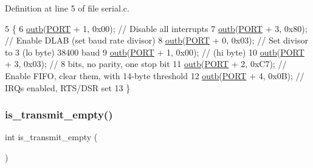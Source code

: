 Definition at line 5 of file serial.\+c.


\begin{DoxyCode}
5                    \{
6    \hyperlink{a00158_aa37f5841c54156a4b14fc0d6f626b44f_aa37f5841c54156a4b14fc0d6f626b44f}{outb}(\hyperlink{a00050_a614217d263be1fb1a5f76e2ff7be19a2_a614217d263be1fb1a5f76e2ff7be19a2}{PORT} + 1, 0x00);    \textcolor{comment}{// Disable all interrupts}
7    \hyperlink{a00158_aa37f5841c54156a4b14fc0d6f626b44f_aa37f5841c54156a4b14fc0d6f626b44f}{outb}(\hyperlink{a00050_a614217d263be1fb1a5f76e2ff7be19a2_a614217d263be1fb1a5f76e2ff7be19a2}{PORT} + 3, 0x80);    \textcolor{comment}{// Enable DLAB (set baud rate divisor)}
8    \hyperlink{a00158_aa37f5841c54156a4b14fc0d6f626b44f_aa37f5841c54156a4b14fc0d6f626b44f}{outb}(\hyperlink{a00050_a614217d263be1fb1a5f76e2ff7be19a2_a614217d263be1fb1a5f76e2ff7be19a2}{PORT} + 0, 0x03);    \textcolor{comment}{// Set divisor to 3 (lo byte) 38400 baud}
9    \hyperlink{a00158_aa37f5841c54156a4b14fc0d6f626b44f_aa37f5841c54156a4b14fc0d6f626b44f}{outb}(\hyperlink{a00050_a614217d263be1fb1a5f76e2ff7be19a2_a614217d263be1fb1a5f76e2ff7be19a2}{PORT} + 1, 0x00);    \textcolor{comment}{//                  (hi byte)}
10    \hyperlink{a00158_aa37f5841c54156a4b14fc0d6f626b44f_aa37f5841c54156a4b14fc0d6f626b44f}{outb}(\hyperlink{a00050_a614217d263be1fb1a5f76e2ff7be19a2_a614217d263be1fb1a5f76e2ff7be19a2}{PORT} + 3, 0x03);    \textcolor{comment}{// 8 bits, no parity, one stop bit}
11    \hyperlink{a00158_aa37f5841c54156a4b14fc0d6f626b44f_aa37f5841c54156a4b14fc0d6f626b44f}{outb}(\hyperlink{a00050_a614217d263be1fb1a5f76e2ff7be19a2_a614217d263be1fb1a5f76e2ff7be19a2}{PORT} + 2, 0xC7);    \textcolor{comment}{// Enable FIFO, clear them, with 14-byte threshold}
12    \hyperlink{a00158_aa37f5841c54156a4b14fc0d6f626b44f_aa37f5841c54156a4b14fc0d6f626b44f}{outb}(\hyperlink{a00050_a614217d263be1fb1a5f76e2ff7be19a2_a614217d263be1fb1a5f76e2ff7be19a2}{PORT} + 4, 0x0B);    \textcolor{comment}{// IRQs enabled, RTS/DSR set}
13 \}
\end{DoxyCode}
\mbox{\label{a00053_a01fe5504f7b8f4eee1545737495bae76_a01fe5504f7b8f4eee1545737495bae76}} 
\subsubsection{\texorpdfstring{is\+\_\+transmit\+\_\+empty()}{is\_transmit\_empty()}}
{\footnotesize\ttfamily int is\+\_\+transmit\+\_\+empty (\begin{DoxyParamCaption}{ }\end{DoxyParamCaption})}



